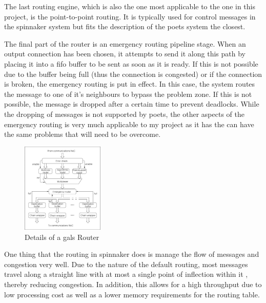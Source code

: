 \documentclass[paper=a4, fontsize=11pt, bibliography=totocnumbered]{scrartcl}
\numberwithin{equation}{section}		%
\numberwithin{figure}{section}			%
\numberwithin{table}{section}				%
\begin{document}
The last routing engine, which is also the one most applicable to the one in this project, is the point-to-point routing. It is typically used for control \glspl{message} in the \gls{spinnaker} system but fits the description of the \gls{poets} system the closest.

The final part of the router is an emergency routing pipeline stage. When an output connection has been chosen, it attempts to send it along this path by placing it into a \gls{fifo} buffer to be sent as soon as it is ready. If this is not possible due to the buffer being full (thus the connection is congested) or if the connection is broken, the emergency routing is put in effect. In this case, the system routes the \gls{message} to one of it's neighbours to bypass the problem zone\cite{pub:navaridas2009understanding}. If this is not possible, the \gls{message} is dropped after a certain time to prevent deadlocks. While the dropping of \glspl{message} is not supported by \gls{poets}, the other aspects of the emergency routing is very much applicable to my project as it has the can have the same problems that will need to be overcome.

\begin{figure}
\centering
\vspace{-\normalbaselineskip}
\includegraphics[width=0.35\textwidth,keepaspectratio]{gals_router.png}
\caption{Details of a \gls{gals} Router\cite{art:1_plana_furber_temple_khan_shi_wu_yang_2007}}
\label{fig:gals_router}
\end{figure}

One thing that the routing in \gls{spinnaker} does is manage the flow of \glspl{message} and congestion very well. Due to the nature of the default routing, most \glspl{message} travel along a straight line with at most a single point of inflection within it \cite{pub:2_khan_lester_plana_rast_jin_painkras_furber_2008}, thereby reducing congestion. In addition, this allows for a high throughput due to low processing cost as well as a lower memory requirements for the routing table.
\end{document}
